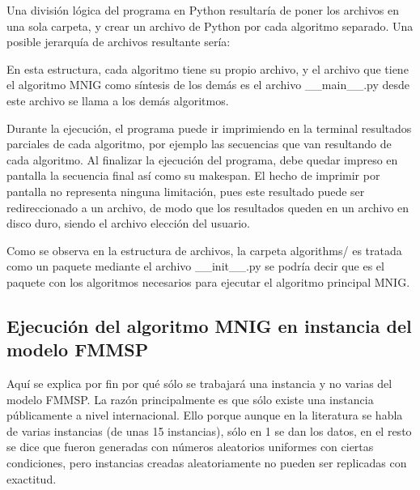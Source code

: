 \documentclass{article}
\begin{document}
\vspace{\baselineskip}
Una división lógica del programa en Python resultaría de poner los archivos
en una sola carpeta, y crear un archivo de Python por cada algoritmo separado.
Una posible jerarquía de archivos resultante sería:

\vspace{\baselineskip}

\vspace{\baselineskip}
En esta estructura, cada algoritmo tiene su propio archivo, y el archivo que
tiene el algoritmo MNIG como síntesis de los demás es el archivo \_\_main\_\_.py
desde este archivo se llama a los demás algoritmos.

\vspace{\baselineskip}
Durante la ejecución, el programa puede ir imprimiendo en la
terminal resultados parciales de cada algoritmo, por ejemplo las secuencias
que van resultando de cada algoritmo. Al finalizar la ejecución del programa, 
debe quedar impreso en pantalla la secuencia final así como su makespan. El
hecho de imprimir por pantalla no representa ninguna limitación, pues este
resultado puede ser redireccionado a un archivo, de modo que los resultados
queden en un archivo en disco duro, siendo el archivo elección del usuario.

\vspace{\baselineskip}
Como se observa en la estructura de archivos, la carpeta algorithms/ es
tratada como un paquete mediante el archivo \_\_init\_\_.py se podría decir
que es el paquete con los algoritmos necesarios para ejecutar el algoritmo
principal MNIG.

\subsection{Ejecución del algoritmo MNIG en instancia del modelo FMMSP}

Aquí se explica por fin por qué sólo se trabajará una instancia y no varias
del modelo FMMSP. La razón principalmente es que sólo existe una instancia
públicamente a nivel internacional. Ello porque aunque en la literatura se
habla de varias instancias (de unas 15 instancias), sólo en 1 se dan los datos,
en el resto se dice que fueron generadas con números aleatorios uniformes con
ciertas condiciones, pero instancias creadas aleatoriamente no pueden ser
replicadas con exactitud. \autocite{modFMMSP}
\end{document}

